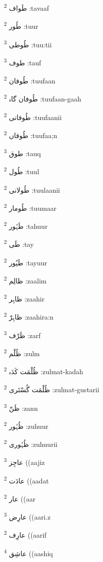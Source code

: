 \documentclass[12pt]{article}
\begin{document}
\begin{multicols}{5}
{\ur طَواف}   \textsuperscript{2} :tavaaf

{\ur طُور}   \textsuperscript{2} :tuur

{\ur طُوطی}   \textsuperscript{3} :tuu:tii

{\ur طوف}   \textsuperscript{3} :tauf

{\ur طُوفان}   \textsuperscript{2} :tuufaan

{\ur طُوفان گاہ}   \textsuperscript{2} :tuufaan-gaah

{\ur طُوفانی}   \textsuperscript{2} :tuufaanii

{\ur طُوفاں}   \textsuperscript{2} :tuufaa;n

{\ur طوق}   \textsuperscript{3} :tauq

{\ur طُول}   \textsuperscript{2} :tuul

{\ur طُولانی}   \textsuperscript{2} :tuulaanii

{\ur طُومار}   \textsuperscript{2} :tuumaar

{\ur طَہُور}   \textsuperscript{2} :tahuur

{\ur طَی}   \textsuperscript{2} :tay

{\ur طَیُور}   \textsuperscript{2} :tayuur

{\ur ظالِم}   \textsuperscript{2} :zaalim

{\ur ظاہِر}   \textsuperscript{2} :zaahir

{\ur ظاہِرًَ}   \textsuperscript{2} :zaahira:n

{\ur ظَرْف}   \textsuperscript{3} :zarf

{\ur ظُلْم}   \textsuperscript{2} :zulm

{\ur ظُلْمَت کَدَہ}   \textsuperscript{2} :zulmat-kadah

{\ur ظُلْمَت گُسْتَری}   \textsuperscript{2} :zulmat-gustarii

{\ur ظَنّ}   \textsuperscript{3} :zann

{\ur ظُہُور}   \textsuperscript{2} :zuhuur

{\ur ظُہُوری}   \textsuperscript{2} :zuhuurii

{\ur عاجِز}   \textsuperscript{3} ((aajiz

{\ur عادَت}   \textsuperscript{2} ((aadat

{\ur عار}   \textsuperscript{2} ((aar

{\ur عارِض}   \textsuperscript{3} ((aari.z

{\ur عارِف}   \textsuperscript{2} ((aarif

{\ur عاشِق}   \textsuperscript{4} ((aashiq


\end{multicols}
\end{document}
